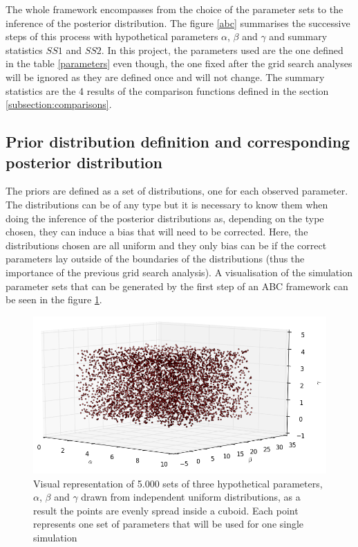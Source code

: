 \documentclass[a4paper,12pt]{report}
\begin{document}
The whole framework encompasses from the choice of the parameter sets to the inference of the posterior distribution. The figure \ref{abc} summarises the successive steps of this process with hypothetical parameters $\alpha$, $\beta$ and $\gamma$ and summary statistics $SS1$ and $SS2$. In this project, the parameters used are the one defined in the table \ref{parameters} even though, the one fixed after the grid search analyses will be ignored as they are defined once and will not change. The summary statistics are the 4 results of the comparison functions defined in the section \ref{subsection:comparisons}.

\subsection{Prior distribution definition and corresponding posterior distribution}
The priors are defined as a set of distributions, one for each observed parameter. The distributions can be of any type but it is necessary to know them when doing the inference of the posterior distributions as, depending on the type chosen, they can induce a bias that will need to be corrected. Here, the distributions chosen are all uniform and they only bias can be if the correct parameters lay outside of the boundaries of the distributions (thus the importance of the previous grid search analysis). A visualisation of the simulation parameter sets that can be generated by the first step of an ABC framework can be seen in the figure \ref{abc-space}.

\begin{figure}[ht]
	\centering
	\includegraphics[scale=0.5]{../data/abc-space.png}
	\caption{Visual representation of 5.000 sets of three hypothetical parameters, $\alpha$, $\beta$ and $\gamma$ drawn from independent uniform distributions, as a result the points are evenly spread inside a cuboid. Each point represents one set of parameters that will be used for one single simulation}
	\label{abc-space}
\end{figure}
\end{document}
